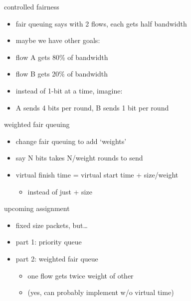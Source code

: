 \begin{frame}{controlled fairness}
    \begin{itemize}
    \item fair queuing says with 2 flows, each gets half bandwidth
    \item maybe we have other goals:
    \item flow A gets 80\% of bandwidth
    \item flow B gets 20\% of bandwidth
    \vspace{.5cm}
    \item<2-> instead of 1-bit at a time, imagine:
    \item<2-> A sends 4 bits per round, B sends 1 bit per round
    \end{itemize}
\end{frame}

\begin{frame}{weighted fair queuing}
    \begin{itemize}
    \item change fair queuing to add `weights'
    \item say N bits takes N/weight rounds to send
    \vspace{.5cm}
    \item virtual finish time = virtual start time + size/weight
        \begin{itemize}
        \item instead of just + size
        \end{itemize}
    \end{itemize}
\end{frame}

\begin{frame}{upcoming assignment}
    \begin{itemize}
    \item fixed size packets, but\ldots
    \item part 1: priority queue
    \item part 2: weighted fair queue
        \begin{itemize}
        \item one flow gets twice weight of other
        \item (yes, can probably implement w/o virtual time)
        \end{itemize}
    \end{itemize}
\end{frame}
